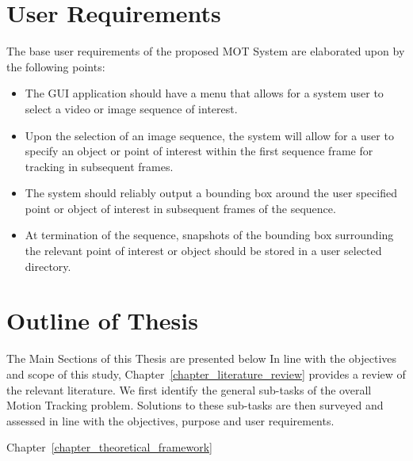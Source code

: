 \section{User Requirements}\label{introduction_user_requirements}
The base user requirements of the proposed MOT System are elaborated upon by the
following points:
\begin{itemize}
    \item The GUI application should have a menu that allows for a system
        user to select a video or image sequence of interest.
    \item Upon the selection of an image sequence, the system will allow for a
        user to specify an object or point of interest within the first sequence
        frame for tracking in subsequent frames.
    \item The system should reliably output a bounding box around the user
        specified point or object of interest in subsequent frames of the
        sequence. 
    \item At termination of the sequence, snapshots of the bounding box
        surrounding the relevant point of interest or object should be stored in
        a user selected directory.
\end{itemize}

\section{Outline of Thesis}
The Main Sections of this Thesis are presented below  In line with the objectives and scope
of this study, Chapter~\ref{chapter_literature_review} provides a review of the
relevant literature. We first identify the general sub-tasks of the overall
Motion Tracking problem. Solutions to these sub-tasks are then surveyed and
assessed in line with the objectives, purpose and user requirements. 

Chapter~\ref{chapter_theoretical_framework}  



